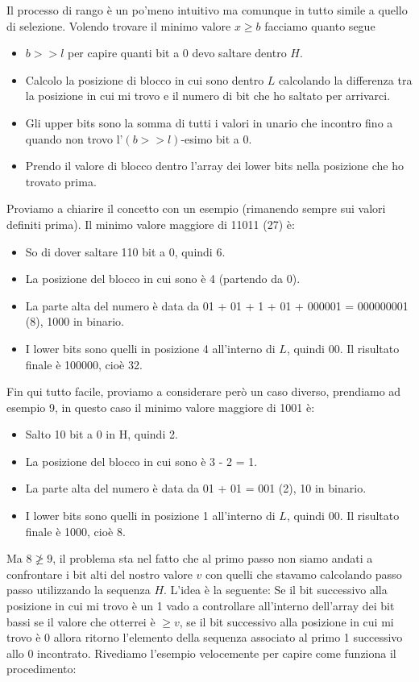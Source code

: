 Il processo di rango è un po'meno intuitivo ma comunque in tutto simile a quello di selezione. Volendo trovare il minimo valore $x \geq b$ facciamo quanto segue
\begin{itemize}
    \item $b >> l$ per capire quanti bit a 0 devo saltare dentro $H$.
    \item Calcolo la posizione di blocco in cui sono dentro $L$ calcolando la differenza tra la posizione in cui mi trovo e il numero di bit che ho saltato per arrivarci.
    \item Gli upper bits sono la somma di tutti i valori in unario che incontro fino a quando non trovo l'$(b >> l)$-esimo bit a 0.
    \item Prendo il valore di blocco dentro l'array dei lower bits nella posizione che ho trovato prima.
\end{itemize}
Proviamo a chiarire il concetto con un esempio (rimanendo sempre sui valori definiti prima). Il minimo valore maggiore di 11011 (27) è:
\begin{itemize}
    \item So di dover saltare 110 bit a 0, quindi 6.
    \item La posizione del blocco in cui sono è 4 (partendo da 0).
    \item La parte alta del numero è data da 01 + 01 + 1 + 01 + 000001 = 000000001 (8), 1000 in binario.
    \item I lower bits sono quelli in posizione 4 all'interno di $L$, quindi 00. Il risultato finale è 100000, cioè 32.
\end{itemize}
Fin qui tutto facile, proviamo a considerare però un caso diverso, prendiamo ad esempio 9, in questo caso il minimo valore maggiore di 1001 è:
\begin{itemize}
    \item Salto 10 bit a 0 in H, quindi 2.
    \item La posizione del blocco in cui sono è 3 - 2 = 1.
    \item La parte alta del numero è data da 01 + 01 = 001 (2), 10 in binario.
    \item I lower bits sono quelli in posizione 1 all'interno di $L$, quindi 00. Il risultato finale è 1000, cioè 8.
\end{itemize}
Ma $8 \ngeq 9$, il problema sta nel fatto che al primo passo non siamo andati a confrontare i bit alti del nostro valore $v$ con quelli che stavamo calcolando passo passo utilizzando la sequenza $H$. L'idea è la seguente: Se il bit successivo alla posizione in cui mi trovo è un 1 vado a controllare all'interno dell'array dei bit bassi se il valore che otterrei è $\geq v$, se il bit successivo alla posizione in cui mi trovo è 0 allora ritorno l'elemento della sequenza associato al primo 1 successivo allo 0 incontrato. Rivediamo l'esempio velocemente per capire come funziona il procedimento:
